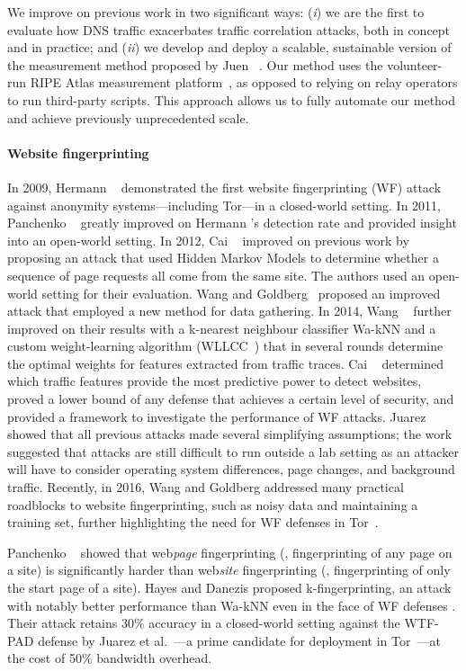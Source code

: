 We improve on previous work in two significant ways: (\emph{i}) we are
the first to evaluate how DNS traffic exacerbates traffic correlation
attacks, both in concept and in practice; and (\emph{ii}) we develop and
deploy a scalable, sustainable version of the measurement method proposed by Juen
\ea~\cite{Juen2015a}.  Our method uses the volunteer-run RIPE Atlas
measurement platform~\cite{atlas}, as opposed to relying on relay operators
to run third-party scripts.  This approach allows us to fully automate
our method and achieve previously unprecedented scale.

\paragraph{Website fingerprinting}
In 2009, Hermann \ea~\cite{Hermann2009a} demonstrated the first website
fingerprinting (WF) attack against anonymity systems---including Tor---in a
closed-world setting.  In 2011, Panchenko \ea~\cite{Panchenko2011a} greatly
improved on Hermann \ea's detection rate and provided insight into an open-world
setting.  In 2012, Cai \ea~\cite{Cai2012a} improved on previous work by
proposing an attack that used Hidden Markov Models to determine whether a sequence of
page requests all come from the same site.  The authors used an open-world
setting for their evaluation.  Wang and Goldberg~\cite{Wang2013a} proposed an
improved attack that employed a new method for data gathering.  In 2014, Wang
\ea~\cite{Wang2014a} further improved on their results with a
k-nearest neighbour classifier Wa-kNN and a custom weight-learning algorithm
(WLLCC~\cite{WangThesis}) that in several rounds determine the optimal weights
for features extracted from traffic traces.
Cai \ea~\cite{Cai2014b}
determined which traffic features provide the most predictive power to detect
websites, proved a lower bound of any defense that achieves a certain level of
security, and provided a framework to investigate the performance of
WF attacks.  Juarez~\cite{Juarez2014a} showed that all previous attacks
made several simplifying
assumptions; the work suggested that attacks are still
difficult to run outside a lab setting as an attacker will have to consider
operating system differences, page changes, and background traffic.
Recently, in 2016, Wang and Goldberg addressed many practical
roadblocks to website fingerprinting, such as noisy data and maintaining a training set,
further highlighting the need for WF defenses in Tor~\cite{taoianreally}.

Panchenko \ea~\cite{Panchenko2016a} showed that web\emph{page}
fingerprinting (\ie, fingerprinting of any page on a site) is
significantly harder than web\emph{site} fingerprinting (\ie,
fingerprinting of only the start page of a site).  Hayes and Danezis
proposed k-fingerprinting, an attack with notably better performance
than Wa-kNN even in the face of WF defenses
\cite{kfingerprinting}. Their attack retains 30\% accuracy in a
closed-world setting against the WTF-PAD defense by Juarez et
al.~\cite{DBLP:journals/corr/JuarezIPDW15}---a prime candidate for
deployment in Tor~\cite{adapativepadding}---at the cost of 50\% bandwidth
overhead.

